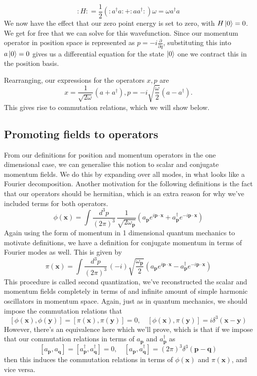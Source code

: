 \documentclass[11pt, oneside]{article}   	%
\theoremstyle{newline}
\theoremstyle{newline}
\theoremstyle{newline}
\theoremstyle{newline}
\theoremstyle{newline}
\newcommand{\intp}{ \int \frac{ d^3 p }{ (2 \pi)^3 } \, }
\newcommand{\ann}[1]{a_{ \mathbf{ #1 }}}
\newcommand{\crea}[1]{a^\dagger_{ \mathbf{ #1 }}}
\newcommand{\ve}[1]{ \mathbf{ #1 } }
\newcommand{\mode}[ 1]{ e^{ i \mathbf{ #1 } \cdot \mathbf{x} }}
\newcommand{\nmode}[1]{ e^{  - i \mathbf{ #1 } \cdot \mathbf{x} }}
\newcommand{\freq}[1]{\omega_\mathbf{ #1} }
\newcommand{\scal}[1]{\phi ( \mathbf{ #1 })}
\newcommand{\mom}[1]{ \pi (\mathbf{ #1 })}
\begin{document}
\[ 	
:H: = \frac{ 1}{ 2} ( : a^\dagger a : + : a a^\dagger: )  \omega  = \omega a^\dagger a 
\]
We now have the effect that our zero point energy is set to zero, with $H\ket{ 0 }  =0 $. We get for free that we can solve for this wavefunction. Since our momentum operator in position space is represented as $p = - i \frac{ \partial}{ \partial q } $, substituting this into $a \ket{0}  = 0$ gives us a differential equation for the state $\ket{0}$ one we contract this in the position basis. 

Rearranging, our expressions for the operators $x, p$ are 
\[ 
x = \frac{1}{\sqrt{2 \omega}} \left( a + a^\dagger \right), p = - i \sqrt{\frac{\omega}{2}} \left( a - a^\dagger \right). 
\] 
This gives rise to commutation relations, which we will show below. 

\subsection{Promoting fields to operators} 
From our definitions for position and momentum operators in the one dimensional case, we can generalise this notion to scalar and conjugate momentum fields. We do this by expanding over all modes, in what looks like a Fourier decomposition. Another motivation for the following definitions is the fact that our operators should be hermitian, which is an extra reason for why we've included terms for both operators.
\[ 
\scal{x}  = \intp \frac{ 1 }{  \sqrt{ 2 \freq{ p}}  } \left( \ann{p} \mode{p}  + \crea{ p} \nmode{p} \right) 
\] 
Again using the form of momentum in 1 dimensional quantum mechanics to motivate definitions, we have a definition for conjugate momentum in terms of Fourier modes as well. This is given by 
\[ 
\mom{x} = \intp ( -i )  \sqrt{ \frac{ \freq{p} }{ 2 } } \left( \ann{p} \mode{p} - \crea{p} \nmode{p} \right) 
\] This procedure is called second quantization, we've reconstructed the scalar and momentum fields completely in terms of and infinite amount of simple harmonic oscillators in momentum space. Again, just as in quantum mechanics, we should impose the commutation relations that 
\[ 
[ \scal{ x}, \scal{y} ] = [ \mom{x},  \mom{y}  ]  = 0, \quad [ \scal{ x}, \mom{y} ] =i  \delta^3 ( \ve{x - y } ) 
\]
However, there's an equivalence here which we'll prove, which is that if we impose that our commutation relations in terms of $\ann{p}$ and $\crea{p}$ as 
\[ 
[ \ann{ p}, \ann{q } ] = [ \crea{p}, \crea{q} ] = 0, \quad [ \ann{p}, \crea{q} ] = ( 2 \pi)^3 \delta^3 ( \mathbf{p - q} ) 
\] then this induces the commutation relations in terms of $\scal{x}$ and $\mom{x}$, and vice versa. 
\end{document}
